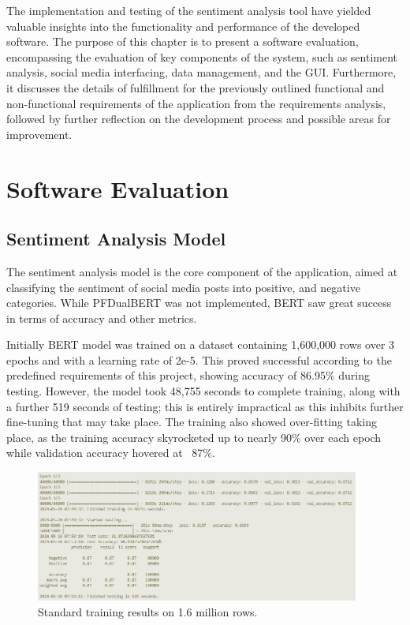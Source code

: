 The implementation and testing of the sentiment analysis tool \citep{sentimentanalysistool} have yielded valuable insights into the functionality and performance of the developed software. The purpose of this chapter is to present a software evaluation, encompassing the evaluation of key components of the system, such as sentiment analysis, social media interfacing, data management, and the GUI. Furthermore, it discusses the details of fulfillment for the previously outlined functional and non-functional requirements of the application from the requirements analysis, followed by further reflection on the development process and possible areas for improvement.

\section{Software Evaluation}
    \subsection{Sentiment Analysis Model}
    The sentiment analysis model is the core component of the application, aimed at classifying the sentiment of social media posts into positive, and negative categories. While PFDualBERT was not implemented, BERT saw great success in terms of accuracy and other metrics.

    Initially BERT model was trained on a dataset containing 1,600,000 rows over 3 epochs and with a learning rate of 2e-5. This proved successful according to the predefined requirements of this project, showing accuracy of 86.95\% during testing. However, the model took 48,755 seconds to complete training, along with a further 519 seconds of testing; this is entirely impractical as this inhibits further fine-tuning that may take place. The training also showed over-fitting taking place, as the training accuracy skyrocketed up to nearly 90\% over each epoch while validation accuracy hovered at ~87\%.

    \FloatBarrier
    \begin{figure}[h]
        \centering
        \includegraphics[width=0.95\textwidth]{figures/train-16m-console.png}
        \caption{Standard training results on 1.6 million rows.}
    \end{figure}

